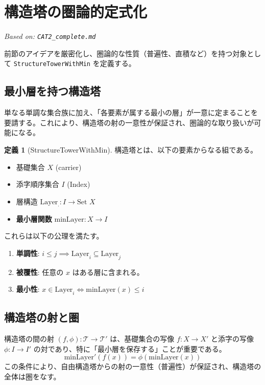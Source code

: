 \documentclass[a4paper,11pt]{ltjsarticle}
\theoremstyle{definition}
\newtheorem{definition}{定義}[section]
\newcommand{\Tower}{\mathcal{T}}
\newcommand{\Layer}[1]{\mathrm{Layer}_{#1}}
\newcommand{\MinLayer}{\mathrm{minLayer}}
\begin{document}
\section{構造塔の圏論的定式化}
\label{sec:cat2}
\textit{Based on: \texttt{CAT2\_complete.md}}

前節のアイデアを厳密化し、圏論的な性質（普遍性、直積など）を持つ対象として \texttt{StructureTowerWithMin} を定義する。

\subsection{最小層を持つ構造塔}
単なる単調な集合族に加え、「各要素が属する最小の層」が一意に定まることを要請する。これにより、構造塔の射の一意性が保証され、圏論的な取り扱いが可能になる。

\begin{definition}[StructureTowerWithMin]
構造塔とは、以下の要素からなる組である。
\begin{itemize}
    \item 基礎集合 $X$ (carrier)
    \item 添字順序集合 $I$ (Index)
    \item 層構造 $\Layer{\cdot}: I \to \text{Set } X$
    \item \textbf{最小層関数} $\MinLayer: X \to I$
\end{itemize}
これらは以下の公理を満たす。
\begin{enumerate}
    \item \textbf{単調性}: $i \le j \implies \Layer{i} \subseteq \Layer{j}$
    \item \textbf{被覆性}: 任意の $x$ はある層に含まれる。
    \item \textbf{最小性}: $x \in \Layer{i} \iff \MinLayer(x) \le i$
\end{enumerate}
\end{definition}

\subsection{構造塔の射と圏}
構造塔の間の射 $(f, \phi): \Tower \to \Tower'$ は、基礎集合の写像 $f: X \to X'$ と添字の写像 $\phi: I \to I'$ の対であり、特に「最小層を保存する」ことが重要である。
\[ \MinLayer'(f(x)) = \phi(\MinLayer(x)) \]
この条件により、自由構造塔からの射の一意性（普遍性）が保証され、構造塔の全体は圏をなす。
\end{document}
